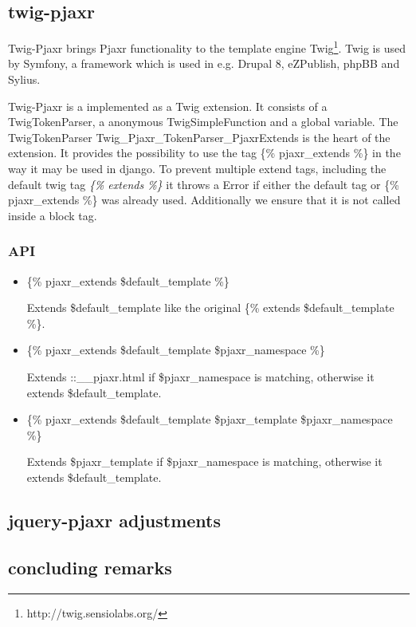 \documentclass[f,bachelor,binding,twoside,palatino]{WeSTthesis}
\def \jqueryPjaxr {jquery-pjaxr}
\def \twigPjaxr {twig-pjaxr}
\begin{document}
\subsection{\twigPjaxr{}}
Twig-Pjaxr brings Pjaxr functionality to the template engine Twig\footnote{http://twig.sensiolabs.org/}.
Twig is used by Symfony, a framework which is used in e.g. Drupal 8, eZPublish, phpBB and Sylius.

Twig-Pjaxr is a implemented as a Twig extension.
It consists of a TwigTokenParser, a anonymous TwigSimpleFunction and a global variable.
The TwigTokenParser Twig\_Pjaxr\_TokenParser\_PjaxrExtends is the heart of the extension.
It provides the possibility to use the tag \{\% pjaxr\_extends \%\} in the way it may be used in django.
To prevent multiple extend tags, including the default twig tag \emph{\{\% extends \%\}} it throws a Error if either the default tag or \{\% pjaxr\_extends \%\} was already used.
Additionally we ensure that it is not called inside a block tag.

\subsubsection{API}

\begin{itemize}
\item \{\% pjaxr\_extends \$default\_template \%\}

Extends \$default\_template like the original \{\% extends \$default\_template \%\}.
\item \{\% pjaxr\_extends \$default\_template \$pjaxr\_namespace \%\}

Extends ::\_\_pjaxr.html if \$pjaxr\_namespace is matching, otherwise it extends \$default\_template.
\item \{\% pjaxr\_extends \$default\_template \$pjaxr\_template \$pjaxr\_namespace \%\}

Extends \$pjaxr\_template if \$pjaxr\_namespace is matching, otherwise it extends \$default\_template.
\end{itemize}

\subsection{\jqueryPjaxr{} adjustments}

\subsection{concluding remarks}
\end{document}
